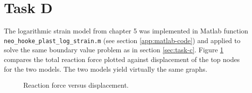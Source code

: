 \section{Task D}
\label{sec:task-d}

The logarithmic strain model from chapter 5 \cite{Ekh2016} was implemented
in Matlab function \texttt{neo\_hooke\_plast\_log\_strain.m} (see 
section \ref{app:matlab-code}) and applied to solve the same boundary 
value problem as in section \ref{sec:task-c}.
Figure \ref{fig:forming-bvp-log-strain} compares the total reaction force
plotted against displacement of the top nodes for the two models.
The two models yield virtually the same graphs.
\begin{figure}[th]
  \centering
    \caption{Reaction force versus displacement.}
  \label{fig:forming-bvp-log-strain}
\end{figure}



